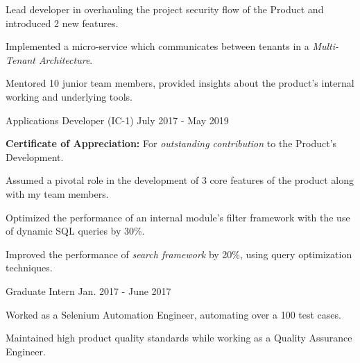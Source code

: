 \begin{cventries}
{\begin{cvitems}
        \item {Lead developer in overhauling the project security flow of the Product and introduced 2 new features.}
        \item {Implemented a micro-service which communicates between tenants in a \textit{Multi-Tenant Architecture}.}
        \item {Mentored 10 junior team members, provided insights about the product's internal working and underlying tools.}
      \end{cvitems}
    }
  \cvexperiencecontinued
    {Applications Developer (IC-1)}
    {}
    {July 2017 - May 2019}
    {
      \begin{cvitems}
        \item {\textbf{Certificate of Appreciation:} For \textit{outstanding contribution} to the Product's Development.}
        \item {Assumed a pivotal role in the development of 3 core features of the product along with my team members.}
        \item {Optimized the performance of an internal module's filter framework with the use of dynamic SQL queries by 30\%.}
        \item {Improved the performance of \textit{search framework} by 20\%, using query optimization techniques.}
      \end{cvitems}
    }
  \cvexperiencecontinued
    {Graduate Intern}
    {}
    {Jan. 2017 - June 2017}
    {
      \begin{cvitems}
        \item {Worked as a Selenium Automation Engineer, automating over a 100 test cases.}
        \item {Maintained high product quality standards while working as a Quality Assurance Engineer.}
      \end{cvitems}
    }
\end{cventries}